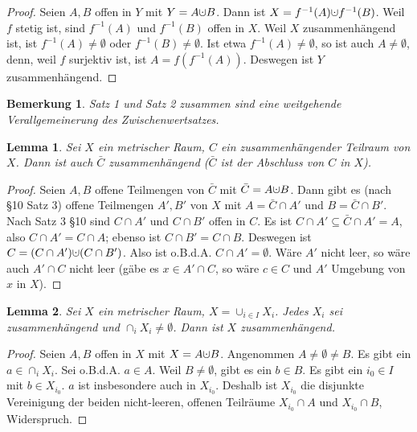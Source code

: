 \documentclass[10pt,a4paper]{report}
\newtheorem*{lemma}{Lemma}
\newtheorem*{remark}{Bemerkung}
\newcommand{\dotcup}{\ensuremath{\mathaccent\cdot\cup}}
\begin{document}
\begin{proof}
  Seien $A, B$ offen in $Y$ mit $Y = A \dotcup B$.
  Dann ist $X = f^{-1}(A) \dotcup f^{-1}(B)$.
  Weil $f$ stetig ist, sind $f^{-1}(A)$ und $f^{-1}(B)$ offen in $X$.
  Weil $X$ zusammenhängend ist, ist $f^{-1}(A) \ne \emptyset$ oder $f^{-1}(B) \ne \emptyset$.
  Ist etwa $f^{-1}(A) \ne \emptyset$, so ist auch $A \ne \emptyset$, denn, weil $f$ surjektiv ist, ist $A = f(f^{-1}(A))$.
  Deswegen ist $Y$ zusammenhängend.
\end{proof}

\begin{remark}
  Satz 1 und Satz 2 zusammen sind eine weitgehende Verallgemeinerung des Zwischenwertsatzes.
\end{remark}

\begin{lemma}
  Sei $X$ ein metrischer Raum, $C$ ein zusammenhängender Teilraum von $X$.
  Dann ist auch $\bar{C}$ zusammenhängend ($\bar{C}$ ist der Abschluss von $C$ in $X$).
\end{lemma}

\begin{proof}
  Seien $A, B$ offene Teilmengen von $\bar{C}$ mit $\bar{C} = A \dotcup B$.
  Dann gibt es (nach §10 Satz 3) offene Teilmengen $A', B'$ von $X$ mit $A = \bar{C} \cap A'$ und $B = \bar{C} \cap B'$.
  Nach Satz 3 §10 sind $C \cap A'$ und $C \cap B'$ offen in $C$.
  Es ist $C \cap A' \subseteq \bar{C} \cap A' = A$, also $C \cap A' = C \cap A$; ebenso ist $C \cap B' = C \cap B$.
  Deswegen ist $C = (C \cap A') \dotcup (C \cap B')$.
  Also ist o.B.d.A. $C \cap A' = \emptyset$.
  Wäre $A'$ nicht leer, so wäre auch $A' \cap C$ nicht leer (gäbe es $x \in A' \cap C$, so wäre $c \in C$ und $A'$ Umgebung von $x$ in $X$).
\end{proof}

\begin{lemma}
  Sei $X$ ein metrischer Raum, $X = \cup_{i \in I} X_{i}$.
  Jedes $X_{i}$ sei zusammenhängend und $\cap_{i} X_{i} \ne \emptyset$.
  Dann ist $X$ zusammenhängend.
\end{lemma}

\begin{proof}
  Seien $A, B$ offen in $X$ mit $X = A \dotcup B$.
  Angenommen $A \ne \emptyset \ne B$.
  Es gibt ein $a \in \cap_{i} X_{i}$.
  Sei o.B.d.A. $a \in A$.
  Weil $B \ne \emptyset$, gibt es ein $b \in B$.
  Es gibt ein $i_{0} \in I$ mit $b \in X_{i_{0}}$.
  $a$ ist insbesondere auch in $X_{i_{0}}$.
  Deshalb ist $X_{i_{0}}$ die disjunkte Vereinigung der beiden nicht-leeren, offenen Teilräume $X_{i_{0}} \cap A$ und $X_{i_{0}} \cap B$, Widerspruch.
\end{proof}
\end{document}
